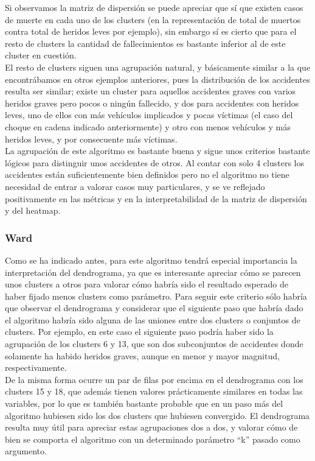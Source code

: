 	Si observamos la matriz de dispersión se puede apreciar que sí que existen casos de muerte en cada uno de los clusters (en la representación de total de muertos contra total de heridos leves por ejemplo), sin embargo sí es cierto que para el resto de clusters la cantidad de fallecimientos es bastante inferior al de este cluster en cuestión.\\

	El resto de clusters siguen una agrupación natural, y básicamente similar a la que encontrábamos en otros ejemplos anteriores, pues la distribución de los accidentes resulta ser similar; existe un cluster para aquellos accidentes graves con varios heridos graves pero pocos o ningún fallecido, y dos para accidentes con heridos leves, uno de ellos con más vehículos implicados y pocas víctimas (el caso del choque en cadena indicado anteriormente) y otro con menos vehículos y más heridos leves, y por consecuente más víctimas.\\
	
	La agrupación de este algoritmo es bastante buena y sigue unos criterios bastante lógicos para distinguir unos accidentes de otros. Al contar con solo 4 clusters los accidentes están suficientemente bien definidos pero no el algoritmo no tiene necesidad de entrar a valorar casos muy particulares, y se ve reflejado positivamente en las métricas y en la interpretabilidad de la matriz de dispersión y del heatmap.
	
	\subsubsection{Ward}
	Como se ha indicado antes, para este algoritmo tendrá especial importancia la interpretación del dendrograma, ya que es interesante apreciar cómo se parecen unos clusters a otros para valorar cómo habría sido el resultado esperado de haber fijado menos clusters como parámetro. Para seguir este criterio sólo habría que observar el dendrograma y considerar que el siguiente paso que habría dado el algoritmo habría sido alguna de las uniones entre dos clusters o conjuntos de clusters. Por ejemplo, en este caso el siguiente paso podría haber sido la agrupación de los clusters 6 y 13, que son dos subconjuntos de accidentes donde solamente ha habido heridos graves, aunque en menor y mayor magnitud, respectivamente.\\
	
	De la misma forma ocurre un par de filas por encima en el dendrograma con los clusters 15 y 18, que además tienen valores prácticamente similares en todas las variables, por lo que es también bastante probable que en un paso más del algoritmo hubiesen sido los dos clusters que hubiesen convergido. El dendrograma resulta muy útil para apreciar estas agrupaciones dos a dos, y valorar cómo de bien se comporta el algoritmo con un determinado parámetro ``k'' pasado como argumento.\\
	
